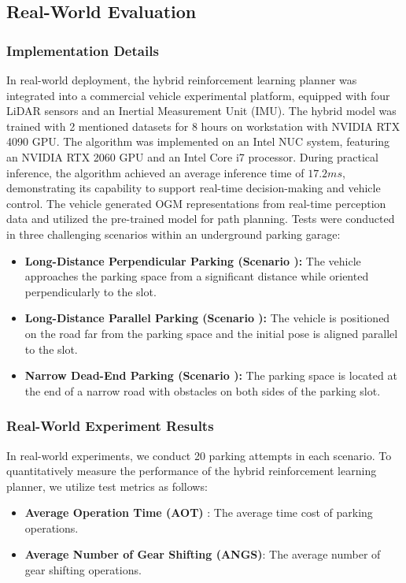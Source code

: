 \documentclass[ conference]{./support/ieeeconf}
\begin{document}
\subsection{Real-World Evaluation}
\subsubsection{Implementation Details}
In real-world deployment, the hybrid reinforcement learning planner was integrated into a commercial vehicle experimental platform, equipped with four LiDAR sensors and an Inertial Measurement Unit (IMU). 
The hybrid model was trained with 2 mentioned datasets for 8 hours on workstation with NVIDIA RTX 4090 GPU.
The algorithm was implemented on an Intel NUC system, featuring an NVIDIA RTX 2060 GPU and an Intel Core i7 processor. 
During practical inference, the algorithm achieved an average inference time of $17.2 ms$, demonstrating its capability to support real-time decision-making and vehicle control.
The vehicle generated OGM representations from real-time perception data and utilized the pre-trained model for path planning. 
Tests were conducted in three challenging scenarios within an underground parking garage: 
\begin{itemize}
    \item \textbf{Long-Distance Perpendicular Parking (Scenario \uppercase\expandafter{}): } The vehicle approaches the parking space from a significant distance while oriented perpendicularly to the slot.
    \item \textbf{Long-Distance Parallel Parking (Scenario \uppercase\expandafter{}):} The vehicle is positioned on the road far from the parking space and the initial pose is aligned parallel to the slot.
    \item \textbf{Narrow Dead-End Parking (Scenario \uppercase\expandafter{}):} The parking space is located at the end of a narrow road with obstacles on both sides of the parking slot.
\end{itemize}



\subsubsection{Real-World Experiment Results}
In real-world experiments, we conduct 20 parking attempts in each scenario. 
To quantitatively measure the performance of the hybrid reinforcement learning planner, we utilize test metrics as follows: 
\begin{itemize}
   
    \item \textbf{Average Operation Time (AOT) }: The average time cost of parking operations.
    
    \item \textbf{Average Number of Gear Shifting (ANGS)}: The average number of gear shifting operations.
\end{itemize}
\end{document}
